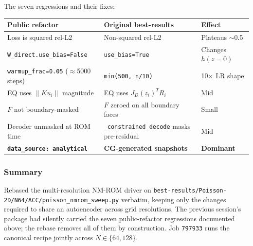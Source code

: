 The seven regressions and their fixes:
\begin{center}
\begin{tabular}{l l l}
  \textbf{Public refactor} & \textbf{Original best-results} & \textbf{Effect} \\
  \hline
  Loss is squared rel-L2          & Non-squared rel-L2                & Plateaus $\sim$0.5 \\
  \texttt{W\_direct.use\_bias=False} & \texttt{use\_bias=True}        & Changes $h(z{=}0)$ \\
  \texttt{warmup\_frac=0.05} ($\approx$5000 steps) & \texttt{min(500, n/10)} & 10$\times$ LR shape \\
  EQ uses $\|K u_i\|$ magnitude   & EQ uses $J_D(z_i)^T R_i$           & Mid \\
  $F$ not boundary-masked         & $F$ zeroed on all boundary faces   & Small \\
  Decoder unmasked at ROM time    & \texttt{\_constrained\_decode} masks pre-residual & Mid \\
  \textbf{\texttt{data\_source: analytical}} & \textbf{CG-generated snapshots} & \textbf{Dominant} \\
\end{tabular}
\end{center}




\subsubsection*{Summary}
Rebased the multi-resolution NM-ROM driver on
\texttt{best-results/Poisson-2D/N64/ACC/poisson\_nmrom\_sweep.py} verbatim,
keeping only the changes required to share an autoencoder across grid
resolutions. The previous session's package had silently carried the seven
public-refactor regressions documented above; the rebase removes all of them
by construction. Job \texttt{797933} runs the canonical recipe jointly across
$N\in\{64, 128\}$.

